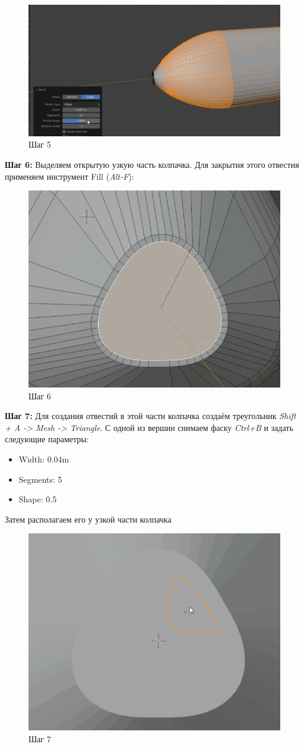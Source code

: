 \documentclass[areasetadvanced]{scrartcl}
\begin{document}
\begin{figure}[H]
    \label{4} 
    \centering
    \includegraphics[width=0.6\linewidth]{col/5.png}
    \caption{Шаг 5}
\end{figure} 


\par \textbf{Шаг 6:} Выделяем открытую узкую часть колпачка. Для закрытия этого отвестия применяем инструмент Fill (\textit{Alt-F}):

\begin{figure}[H]
    \label{4} 
    \centering
    \includegraphics[width=0.6\linewidth]{col/6.png}
    \caption{Шаг 6}
\end{figure} 

\par \textbf{Шаг 7:} Для создания отвестий в этой части колпачка создаём треугольник \textit{Shift + A -> Mesh ->  Triangle}. С одной из вершин снимаем фаску \textit{Ctrl+B} и задать следующие параметры:
\begin{itemize}
    \item Width: 0.04m
    \item Segments: 5
    \item Shape: 0.5
\end{itemize}

Затем располагаем его у узкой части колпачка
\begin{figure}[H]
    \label{4} 
    \centering
    \includegraphics[width=0.6\linewidth]{col/7.png}
    \caption{Шаг 7}
\end{figure} 
\end{document}
